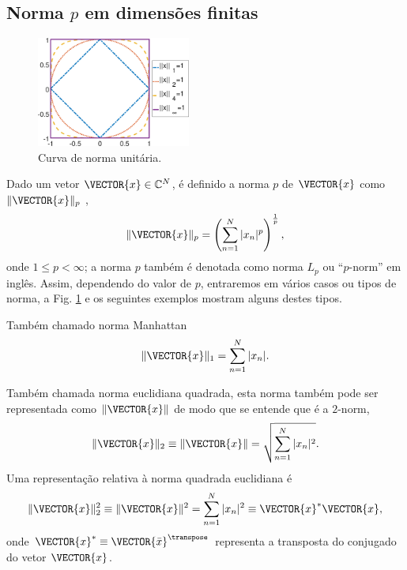 \subsection{Norma $p$ em dimensões finitas} %
\label{subsec:pnorm}
\begin{figure}
     \centering
     \vspace{-15pt}
     \includegraphics[width=0.45\textwidth]{chapters/notacao/pnormcode.eps}
     \caption{Curva de norma unitária.}
     \label{fig:curvaunit}
     \vspace{-30pt}
\end{figure}
Dado um vetor $\VECTOR{x} \in \mathbb{C}^{N}$,
é definido a norma $p$ de $\VECTOR{x}$  como $\|\VECTOR{x}\|_p$ \cite[pp. 33]{vetterli2014foundations}, 
\begin{equation}
\|\VECTOR{x}\|_p=\left(\sum_{n=1}^N |x_n|^p\right)^{\frac{1}{p}},
\end{equation}
onde $1 \leq p < \infty$; a norma $p$
também é denotada como norma $L_p$ ou ``$p$-norm'' em inglês.
Assim, dependendo do valor de $p$, entraremos em vários casos ou tipos de norma,
a Fig. \ref{fig:curvaunit} e os seguintes exemplos mostram alguns destes tipos.

\begin{example}[Norma taxicab - $p=1$:] Também chamado norma Manhattan
\begin{equation}
\|\VECTOR{x}\|_1=\sum_{n=1}^N |x_n|.
\end{equation}
\end{example}

\begin{example}[Norma euclidiana - $p=2$:] Também chamada norma euclidiana quadrada, 
esta norma também pode ser representada como $\|\VECTOR{x}\|$ 
de modo que se entende que é a $2$-norm,
\begin{equation}
\|\VECTOR{x}\|_2\equiv \|\VECTOR{x}\| =\sqrt{\sum_{n=1}^N |x_n|^2}.
\end{equation}
Uma representação relativa à norma quadrada euclidiana é
\begin{equation}
\|\VECTOR{x}\|_2^2\equiv \|\VECTOR{x}\|^2=\sum_{n=1}^N |x_n|^2\equiv \VECTOR{x}^{*} \VECTOR{x},
\end{equation}
onde $\VECTOR{x}^{*}\equiv \VECTOR{\bar{x}}^{\transpose}$ 
representa a transposta do conjugado do vetor  $\VECTOR{x}$. 
\end{example}

